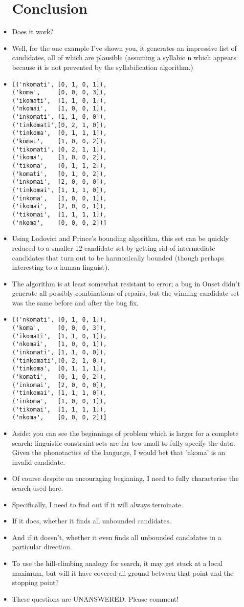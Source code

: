 \documentclass{article}[11pt]
\begin{document}
\begin{itemize}
  \section{Conclusion}
\item Does it work?
\item Well, for the one example I've shown you, it generates an impressive list
  of candidates, all of which are plausible (assuming a syllabic n which appears
  because it is not prevented by the syllabification algorithm.)
\item
  \begin{verbatim}
[('nkomati', [0, 1, 0, 1]),
('koma',     [0, 0, 0, 3]),
('ikomati',  [1, 1, 0, 1]),
('nkomai',   [1, 0, 0, 1]),
('inkomati', [1, 1, 0, 0]),
('tinkomati',[0, 2, 1, 0]),
('tinkoma',  [0, 1, 1, 1]),
('komai',    [1, 0, 0, 2]),
('tikomati', [0, 2, 1, 1]),
('ikoma',    [1, 0, 0, 2]),
('tikoma',   [0, 1, 1, 2]),
('komati',   [0, 1, 0, 2]),
('inkomai',  [2, 0, 0, 0]),
('tinkomai', [1, 1, 1, 0]),
('inkoma',   [1, 0, 0, 1]),
('ikomai',   [2, 0, 0, 1]),
('tikomai',  [1, 1, 1, 1]),
('nkoma',    [0, 0, 0, 2])]
\end{verbatim}
\item Using Lodovici and Prince's bounding algorithm, this set can be quickly
  reduced to a smaller 12-candidate set by getting rid of intermediate
  candidates that turn out to be harmonically bounded (though perhaps interesting
  to a human linguist).
\item The algorithm is at least somewhat resistant to error; a bug in Onset didn't
  generate all possibly combinations of repairs, but the winning candidate set
  was the same before and after the bug fix.
\item
\begin{verbatim}
[('nkomati', [0, 1, 0, 1]),
('koma',     [0, 0, 0, 3]),
('ikomati',  [1, 1, 0, 1]),
('nkomai',   [1, 0, 0, 1]),
('inkomati', [1, 1, 0, 0]),
('tinkomati',[0, 2, 1, 0]),
('tinkoma',  [0, 1, 1, 1]),
('komati',   [0, 1, 0, 2]),
('inkomai',  [2, 0, 0, 0]),
('tinkomai', [1, 1, 1, 0]),
('inkoma',   [1, 0, 0, 1]),
('tikomai',  [1, 1, 1, 1]),
('nkoma',    [0, 0, 0, 2])]
\end{verbatim}
\item Aside: you can see the beginnings of problem which is larger for a complete
  search: linguistic constraint sets are far too small to fully specify the data. Given
  the phonotactics of the language, I would bet that 'nkoma' is an invalid candidate.
\item Of course despite an encouraging beginning, I need to fully characterise
  the search used here.
\item Specifically, I need to find out if it will always terminate.
\item If it does, whether it finds all unbounded candidates.
\item And if it doesn't, whether it even finds all unbounded candidates in a
  particular direction.
\item To use the hill-climbing analogy for search, it may get stuck at a local
  maximum, but will it have covered all ground between that point and the
  stopping point?
\item These questions are UNANSWERED. Please comment!
\end{itemize}
\end{document}
